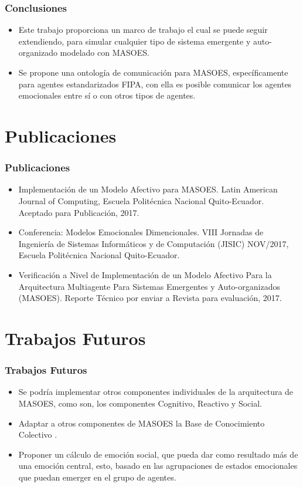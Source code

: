 \documentclass{beamer}
\begin{document}
\begin{frame}
\frametitle{Conclusiones}
\begin{itemize}
  \item Este trabajo proporciona un marco de trabajo el cual se puede seguir extendiendo,
  para simular cualquier tipo de sistema emergente y auto-organizado modelado con MASOES.
  \item Se propone una ontología de
  comunicación para MASOES, específicamente para agentes estandarizados FIPA, con ella
  es posible comunicar los agentes emocionales entre sí o con otros tipos de agentes.
\end{itemize}
\end{frame}

\section{Publicaciones}
\begin{frame}
\frametitle{Publicaciones}
\begin{itemize}
\item Implementación de un Modelo Afectivo para MASOES. Latin American Journal of Computing, Escuela Politécnica Nacional
Quito-Ecuador. Aceptado para Publicación, 2017.
\item Conferencia: Modelos Emocionales Dimencionales. VIII Jornadas de Ingeniería de Sistemas Informáticos y de Computación (JISIC) NOV/2017, Escuela Politécnica Nacional
Quito-Ecuador.
\item Verificación a Nivel de Implementación de un Modelo Afectivo Para la Arquitectura Multiagente Para Sistemas Emergentes y Auto-organizados (MASOES). Reporte Técnico por enviar a Revista para evaluación, 2017.
\end{itemize}
\end{frame}

\section{Trabajos Futuros}
\begin{frame}
\frametitle{Trabajos Futuros}
\begin{itemize}
  \item Se podría implementar otros componentes individuales de la arquitectura de MASOES,
  como son, los componentes Cognitivo, Reactivo y Social.
	\item Adaptar a otros componentes de MASOES la Base de Conocimiento Colectivo .
  \item Proponer un cálculo de emoción social,
  que pueda dar como resultado más de una emoción central, esto, basado en las agrupaciones de estados emocionales
  que puedan emerger en el grupo de agentes.
\end{itemize}
\end{frame}


\ThankYouFrame
\end{document}
